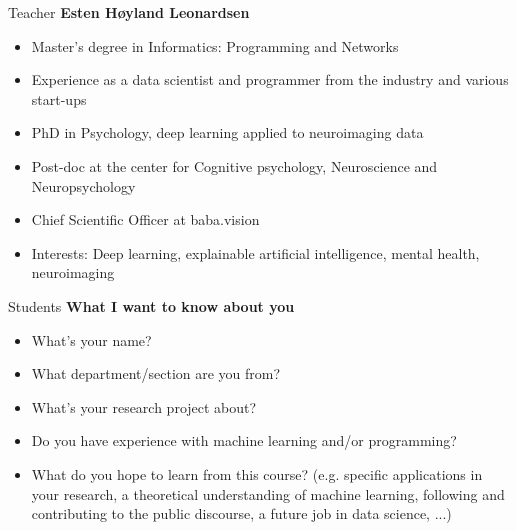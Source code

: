 \begin{frame}{Teacher}
    \textbf{Esten Høyland Leonardsen}
    \begin{itemize}
        \item Master's degree in Informatics: Programming and Networks
        \item Experience as a data scientist and programmer from the industry and various start-ups
        \item PhD in Psychology, deep learning applied to neuroimaging data
        \item Post-doc at the center for Cognitive psychology, Neuroscience and Neuropsychology
        \item Chief Scientific Officer at baba.vision
        \item Interests: Deep learning, explainable artificial intelligence, mental health, neuroimaging
    \end{itemize}
\end{frame}

\begin{frame}{Students}
    \textbf{What I want to know about you}
    \begin{itemize}
        \item What's your name?
        \item What department/section are you from?
        \item What's your research project about?
        \item Do you have experience with machine learning and/or programming?
        \item What do you hope to learn from this course? (e.g. specific applications in your research, a theoretical understanding of machine learning, following and contributing to the public discourse, a future job in data science, ...)
    \end{itemize}
\end{frame}

